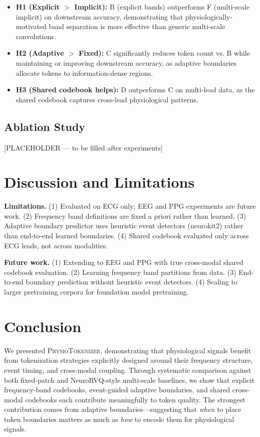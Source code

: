 \documentclass[letterpaper]{article}
\begin{document}
\begin{itemize}
    \item \textbf{H1 (Explicit $>$ Implicit):} B (explicit bands) outperforms
    F (multi-scale implicit) on downstream accuracy, demonstrating that
    physiologically-motivated band separation is more effective than generic
    multi-scale convolutions.

    \item \textbf{H2 (Adaptive $>$ Fixed):} C significantly reduces token count
    vs. B while maintaining or improving downstream accuracy, as adaptive
    boundaries allocate tokens to information-dense regions.

    \item \textbf{H3 (Shared codebook helps):} D outperforms C on multi-lead
    data, as the shared codebook captures cross-lead physiological patterns.
\end{itemize}

\subsection{Ablation Study}

[PLACEHOLDER — to be filled after experiments]

\section{Discussion and Limitations}

\textbf{Limitations.} (1) Evaluated on ECG only; EEG and PPG experiments are
future work. (2) Frequency band definitions are fixed a priori rather than
learned. (3) Adaptive boundary predictor uses heuristic event detectors
(neurokit2) rather than end-to-end learned boundaries. (4) Shared codebook
evaluated only across ECG leads, not across modalities.

\textbf{Future work.} (1) Extending to EEG and PPG with true cross-modal
shared codebook evaluation. (2) Learning frequency band partitions from data.
(3) End-to-end boundary prediction without heuristic event detectors.
(4) Scaling to larger pretraining corpora for foundation model pretraining.

\section{Conclusion}

We presented \textsc{PhysioTokenizer}, demonstrating that physiological
signals benefit from tokenization strategies explicitly designed around
their frequency structure, event timing, and cross-modal coupling. Through
systematic comparison against both fixed-patch and NeuroRVQ-style multi-scale
baselines, we show that explicit frequency-band codebooks, event-guided
adaptive boundaries, and shared cross-modal codebooks each contribute
meaningfully to token quality. The strongest contribution comes from
adaptive boundaries---suggesting that \textit{when} to place token boundaries
matters as much as \textit{how} to encode them for physiological signals.



\end{document}
